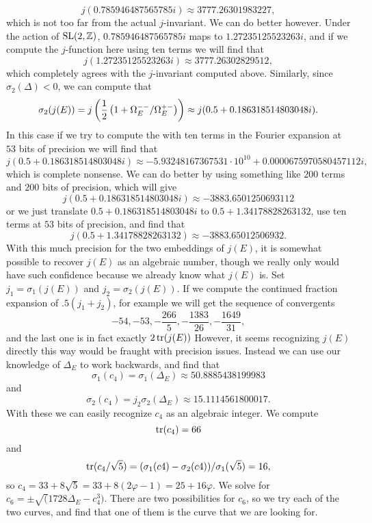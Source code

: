 \[
    j(0.785946487565785i) \approx 3777.26301983227,
\]
which is not too far from the actual $j$-invariant. We can do better however. Under the action of $\operatorname{SL}(2, \mathbb{Z})$,
$0.785946487565785i$ maps to $1.27235125523263i$, and if we compute the $j$-function here using ten terms
we will find that
\[
    j(1.27235125523263i) \approx 3777.26302829512,
\]
which completely agrees with the $j$-invariant computed above. Similarly, since $\sigma_2(\Delta) < 0$,
we can compute that
\[
    \sigma_2(j(E)) = j\left( \frac{1}{2}\left(1 + \Omega^{--}_E/\Omega^{+-}_E\right)\right)
            \approx j(0.5 + 0.186318514803048i).
\]
In this case if we try to compute the with ten terms in the Fourier expansion at $53$ bits of precision
we will find that
\[
     j(0.5 + 0.186318514803048i) \approx -5.93248167367531\cdot 10^{10} + 0.0000675970580457112i,
\]
which is complete nonsense. We can do better by using something like $200$ terms and $200$ bits of precision, which will give
\[
    j(0.5 + 0.186318514803048i) \approx -3883.6501250693112
\]
or we just translate $0.5 + 0.186318514803048i$ to $0.5 + 1.34178828263132$, use ten terms at $53$ bits of
precision, and find that
\[
    j(0.5 + 1.34178828263132) \approx -3883.65012506932.
\]
With this much precision for the two embeddings of $j(E)$, it is somewhat possible to recover $j(E)$ as
an algebraic number, though we really only would have such confidence because we already know what $j(E)$ is.
Set $j_1 = \sigma_1(j(E))$ and $j_2 = \sigma_2(j(E))$. If we compute the continued fraction expansion of
$.5(j_1 + j_2)$, for example we will get the sequence of convergents
\[
    -54, -53, -\frac{266}{5}, -\frac{1383}{26}, -\frac{1649}{31},
\]
and the last one is in fact exactly $2\operatorname{tr}(j(E))$ However, it seems recognizing $j(E)$ directly this
way would be fraught with precision issues. Instead we can use our knowledge of $\Delta_E$ to work
backwards, and find that
\[
    \sigma_1(c_4) = \sigma_1(\Delta_E) \approx 50.8885438199983
\]
and
\[
    \sigma_2(c_4) = j_2 \sigma_2(\Delta_E) \approx 15.1114561800017.
\]
With these we can easily recognize $c_4$ as an algebraic integer. We compute
\[
    \operatorname{tr}(c_4) = 66
\]
and
\[
    \operatorname{tr}(c_4/\sqrt{5}) = (\sigma_1(c4) - \sigma_2(c4))/\sigma_1(\sqrt{5}) = 16,
\]
so $c_4 = 33 + 8\sqrt{5} = 33 + 8(2 \varphi - 1) = 25 + 16 \varphi$. We solve for
$c_6 = \pm \sqrt(1728\Delta_E - c_4^3)$. There are two possibilities for $c_6$, so we try each
of the two curves, and find that one of them is the curve that we are looking for.


